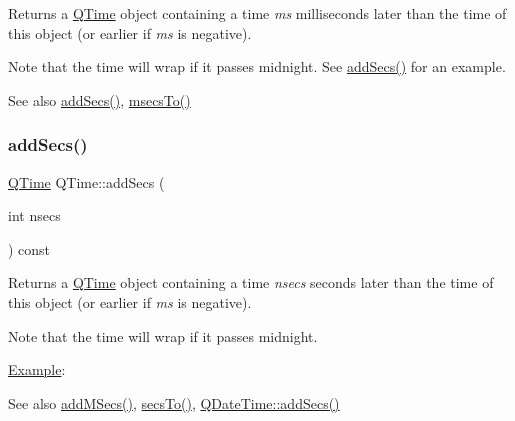 Returns a \mbox{\hyperlink{class_q_time}{Q\+Time}} object containing a time {\itshape ms} milliseconds later than the time of this object (or earlier if {\itshape ms} is negative).

Note that the time will wrap if it passes midnight. See \mbox{\hyperlink{class_q_time_ae5ba40307760c49c56896da08d69c363}{add\+Secs()}} for an example.

\begin{DoxySeeAlso}{See also}
\mbox{\hyperlink{class_q_time_ae5ba40307760c49c56896da08d69c363}{add\+Secs()}}, \mbox{\hyperlink{class_q_time_acc9338f7c222afcf5cf29d7bb6d40667}{msecs\+To()}} 
\end{DoxySeeAlso}
\mbox{\label{class_q_time_ae5ba40307760c49c56896da08d69c363}} 
\subsubsection{\texorpdfstring{addSecs()}{addSecs()}}
{\footnotesize\ttfamily \mbox{\hyperlink{class_q_time}{Q\+Time}} Q\+Time\+::add\+Secs (\begin{DoxyParamCaption}\item[{int}]{nsecs }\end{DoxyParamCaption}) const}

Returns a \mbox{\hyperlink{class_q_time}{Q\+Time}} object containing a time {\itshape nsecs} seconds later than the time of this object (or earlier if {\itshape ms} is negative).

Note that the time will wrap if it passes midnight.

\mbox{\hyperlink{struct_example}{Example}}\+: 
\begin{DoxyCode}{0}
\end{DoxyCode}


\begin{DoxySeeAlso}{See also}
\mbox{\hyperlink{class_q_time_a1b43598c5d992242f13afe4e13a1e59f}{add\+M\+Secs()}}, \mbox{\hyperlink{class_q_time_a8193498cc40d7386b23df740fa326b2b}{secs\+To()}}, \mbox{\hyperlink{class_q_date_time_a7b48ae870775460aec8791465c2e5056}{Q\+Date\+Time\+::add\+Secs()}} 
\end{DoxySeeAlso}
\mbox{\label{class_q_time_a39b156ef7067e581f9fd70de6ef9ea4d}} 
